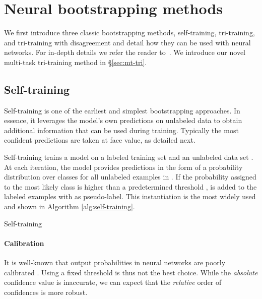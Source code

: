 \documentclass[11pt,a4paper]{article}
\begin{document}
\section{Neural bootstrapping methods} \label{sec:neural_boostrapping}

We first introduce three classic bootstrapping methods, self-training, tri-training, and tri-training with disagreement and detail how they can be used with neural networks. For in-depth details we refer the reader to~\cite{Abney2007,Chapelle2006,Zhu:Goldberg:2009}. We introduce our novel multi-task tri-training method in \S\ref{sec:mt-tri}.

\subsection{Self-training}

Self-training \cite{Yarowsky1995,McClosky2006} is one of the earliest and simplest bootstrapping approaches. In essence, it leverages the model's own predictions on unlabeled data to obtain additional information that can be used during training. Typically the most confident predictions are taken at face value, as detailed next.

Self-training trains a model  on a labeled training set  and an unlabeled data set . At each iteration, the model provides predictions  in the form of a probability distribution over classes for all unlabeled examples  in . If the probability assigned to the most likely class is higher than a predetermined threshold ,  is added to the labeled examples with  as pseudo-label. This instantiation is the most widely used and shown in Algorithm \ref{alg:self-training}. 

\begin{algorithm}\centering
\caption{Self-training \cite{Abney2007}} \label{alg:self-training}
\begin{algorithmic}[1]
\Repeat
	\State 
	\For {}
    	\If {}
        	\State 
    	\EndIf
    \EndFor
{}
\end{algorithmic}
\end{algorithm}


\paragraph{Calibration} It is well-known that output probabilities in neural networks are poorly calibrated \cite{Guo2017}. Using a fixed threshold  is thus not the best choice. While the \emph{absolute} confidence value is inaccurate, we can expect that the \emph{relative} order of confidences is more robust.
\end{document}
